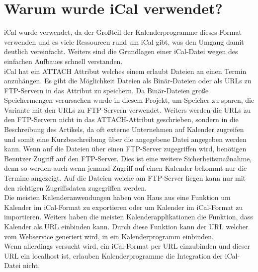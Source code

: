 \section{Warum wurde iCal verwendet?}
\label{sec:warumWurdeiCalVerwendet?}
iCal wurde verwendet, da der Großteil der Kalenderprogramme dieses Format verwenden und es viele Ressourcen rund um iCal gibt, was den Umgang damit deutlich vereinfacht. Weiters sind die Grundlagen einer iCal-Datei wegen des einfachen Aufbaues schnell verstanden.\\
iCal hat ein ATTACH Attribut welches einem erlaubt Dateien an einen Termin anzuhängen. Es gibt die Möglichkeit Dateien als Binär-Dateien oder als URLs zu FTP-Servern in das Attribut zu speichern. Da Binär-Dateien große Speichermengen verursachen wurde in diesem Projekt, um Speicher zu sparen, die Variante mit den URLs zu FTP-Servern verwendet. Weiters werden die URLs zu den FTP-Servern nicht in das ATTACH-Attribut geschrieben, sondern in die Beschreibung des Artikels, da oft externe Unternehmen auf Kalender zugreifen und somit eine Kurzbeschreibung über die angegebene Datei angegeben werden kann. Wenn auf die Dateien über einen FTP-Server zugegriffen wird, benötigen Benutzer Zugriff auf den FTP-Server. Dies ist eine weitere Sicherheitsmaßnahme, denn so werden auch wenn jemand Zugriff auf einen Kalender bekommt nur die Termine angezeigt. Auf die Dateien welche am FTP-Server liegen kann nur mit den richtigen Zugriffsdaten zugegriffen werden.\\
Die meisten Kalenderanwendungen haben von Haus aus eine Funktion um Kalender im iCal-Format zu exportieren oder um Kalender im iCal-Format zu importieren. Weiters haben die meisten Kalenderapplikationen die Funktion, dass Kalender als URL einbinden kann. Durch diese Funktion kann der URL welcher vom Webservice generiert wird, in ein Kalenderprogramm einbinden.
\\
Wenn allerdings versucht wird, ein iCal-Format per URL einzubinden und dieser URL ein localhost ist, erlauben Kalenderprogramme die Integration der iCal-Datei nicht.

